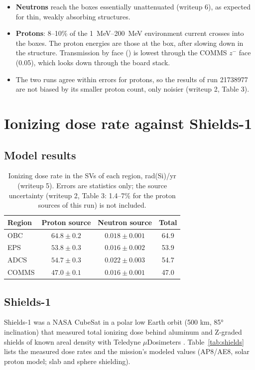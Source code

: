 \begin{itemize}
  \item \textbf{Neutrons} reach the boxes essentially unattenuated (writeup 6), as expected for thin, weakly absorbing structures.
  \item \textbf{Protons}: 8--10\% of the \SIrange{1}{200}{MeV} environment current crosses into the boxes. The proton energies are those at the box, after slowing down in the structure. Transmission by face () is lowest through the COMMS $z^-$ face (0.05), which looks down through the board stack.
  \item The two runs agree within errors for protons, so the \gfour{} results of run 21738977 are not biased by its smaller proton count, only noisier (writeup 2, Table 3).
\end{itemize}

\section{Ionizing dose rate against Shields-1}

\subsection{Model results}
\begin{table}[h]
\centering
\caption{Ionizing dose rate in the SVs of each region, rad(Si)/yr (writeup 5). Errors are \gfour{} statistics only; the \mcdc{} source uncertainty (writeup 2, Table 3: 1.4--7\% for the proton sources of this run) is not included.}
\label{tab:tid}
\begin{tabular}{lccc}
\toprule
Region & Proton source & Neutron source & Total \\
\midrule
OBC   & $64.8\pm0.2$ & $0.018\pm0.001$ & 64.9 \\
EPS   & $53.8\pm0.3$ & $0.016\pm0.002$ & 53.9 \\
ADCS  & $54.7\pm0.3$ & $0.022\pm0.003$ & 54.7 \\
COMMS & $47.0\pm0.1$ & $0.016\pm0.001$ & 47.0 \\
\bottomrule
\end{tabular}
\end{table}

\subsection{Shields-1}
Shields-1 was a NASA CubeSat in a polar low Earth orbit (500 km, \ang{85} inclination) that measured total ionizing dose behind aluminum and Z-graded shields of known areal density with Teledyne $\mu$Dosimeters \citep{thomsen2022shields}. Table~\ref{tab:shields} lists the measured dose rates and the mission's modeled values (AP8/AE8, solar proton model; slab and sphere shielding).


